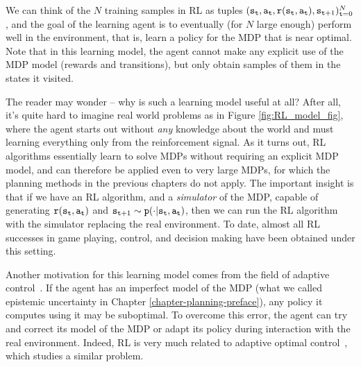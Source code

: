 We can think of the $N$ training samples in RL as tuples $({\tt s}_{\tt t},{\tt a}_{\tt t},{\tt r}({\tt s}_{\tt t},{\tt a}_{\tt t}),{\tt s}_{{\tt t}+1})_{{\tt t}=0}^{N}$, and the goal of the learning agent is to eventually (for $N$ large enough) perform well in the environment, that is, learn a policy for the MDP that is near optimal. Note that in this learning model, the agent cannot make any explicit use of the MDP model (rewards and transitions), but only obtain samples of them in the states it visited.

The reader may wonder -- why is such a learning model useful at all? After all, it's quite hard to imagine real world problems as in Figure \ref{fig:RL_model_fig}, where the agent starts out without \textit{any} knowledge about the world and must learning everything only from the reinforcement signal. As it turns out, RL algorithms essentially learn to solve MDPs without requiring an explicit MDP model, and can therefore be applied even to very large MDPs, for which the planning methods in the previous chapters do not apply. The important insight is that if we have an RL algorithm, and a \textit{simulator} of the MDP, capable of generating ${\tt r}({\tt s}_{\tt t},{\tt a}_{\tt t})$ and ${\tt s}_{{\tt t}+1}\sim {\tt p}(\cdot | {\tt s}_{\tt t}, {\tt a}_{\tt t})$, then we can run the RL algorithm with the simulator replacing the real environment. To date, almost all RL successes in game playing, control, and decision making have been obtained under this setting.

Another motivation for this learning model comes from the field of adaptive control~\cite{astrom2008adaptive}. If the agent has an imperfect model of the MDP (what we called epistemic uncertainty in Chapter \ref{chapter-planning-preface}), any policy it computes using it may be suboptimal. To overcome this error, the agent can try and correct its model of the MDP or adapt its policy during interaction with the real environment. Indeed, RL is very much related to adaptive optimal control~\cite{sutton1992reinforcement}, which studies a similar problem.




